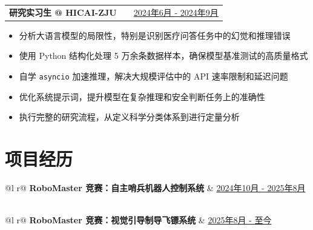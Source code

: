 \documentclass[a4paper,12pt]{article}
\makeatletter
\newenvironment{joblong}[2]
    {
    \begin{tabularx}{\linewidth}{@{}l X r@{}}
    \textbf{#1} & \hfill &  #2 \\[3.75pt]
    \end{tabularx}
    \begin{minipage}[t]{\linewidth}
    \begin{itemize}[nosep,after=\strut, leftmargin=1em, itemsep=3pt,label=--]
    }
    {
    \end{itemize}
    \end{minipage}    
    }
\makeatother
\begin{document}
\begin{joblong}{研究实习生 @ HICAI-ZJU}{\href{https://github.com/HICAI-ZJU/SciKnowEval}{2024年6月 - 2024年9月}}
\item 分析大语言模型的局限性，特别是识别医疗问答任务中的幻觉和推理错误
\item 使用 Python 结构化处理 5 万余条数据样本，确保模型基准测试的高质量格式
\item 自学 \texttt{asyncio} 加速推理，解决大规模评估中的 API 速率限制和延迟问题
\item 优化系统提示词，提升模型在复杂推理和安全判断任务上的准确性
\item 执行完整的研究流程，从定义科学分类体系到进行定量分析
\end{joblong}
  
\section{项目经历}

\begin{tabularx}{\linewidth}{ @{}l r@{} }
\textbf{RoboMaster 竞赛：自主哨兵机器人控制系统} & \hfill \href{https://vamperd.github.io/project/}{2024年10月 - 2025年8月} \\[3.75pt]
  \\
\end{tabularx}

\begin{tabularx}{\linewidth}{ @{}l r@{} }
\textbf{RoboMaster 竞赛：视觉引导制导飞镖系统} & \hfill \href{https://vamperd.github.io/project/}{2025年8月 - 至今} \\[3.75pt]
  \\
\end{tabularx}
\end{document}
